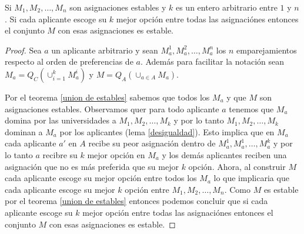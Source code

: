 \begin{teo}
Si $M_1,M_2,\dots,M_n$ son asignaciones estables y $k$ es un entero arbitrario entre $1$ y $n$. Si cada aplicante escoge su $k$ mejor opción entre todas las asignaciónes entonces el conjunto $M$ con esas asignaciones es estable. 
\end{teo}
\begin{proof}
Sea $a$ un aplicante arbitrario y sean $M_a^1,M_a^2,\dots,M_a^n$ los $n$ emparejamientos respecto al orden de preferencias de $a$. Además para facilitar la notación sean $M_a = Q_C(\cup_{i=1}^kM_a^i)$ y  $M=Q_A( \cup_{a \in A} M_a)$.

Por el teorema \ref{union de estables} sabemos que todos los $M_a$ y que $M$ son asignaciones estables. Observamos quer para todo aplicante $a$ tenemos que $M_a$ domina por las universidades a $M_1,M_2,\dots,M_k$ y por lo tanto $M_1,M_2,\dots,M_k$ dominan a $M_a$ por los aplicantes (lema \ref{desigualdad}). Esto implica que en $M_a$ cada aplicante $a'$ en $A$ recibe su peor asignación dentro de $M_a^1,M_a^1,\dots,M_a^k$ y por lo tanto $a$ recibre su $k$ mejor opción en $M_a$ y los demás aplicantes reciben una asignación que no es más preferida que su mejor $k$ opción. Ahora, al construir $M$ cada aplicante escoge su mejor opción entre todos los $M_a$ lo que implicaria que cada aplicante escoge su mejor $k$ opción entre $M_1,M_2,\dots,M_n$. Como $M$ es estable por el teorema \ref{union de estables} entonces podemos concluir que si cada aplicante escoge su $k$ mejor opción entre todas las asignaciónes entonces el conjunto $M$ con esas asignaciones es estable.
\end{proof}




